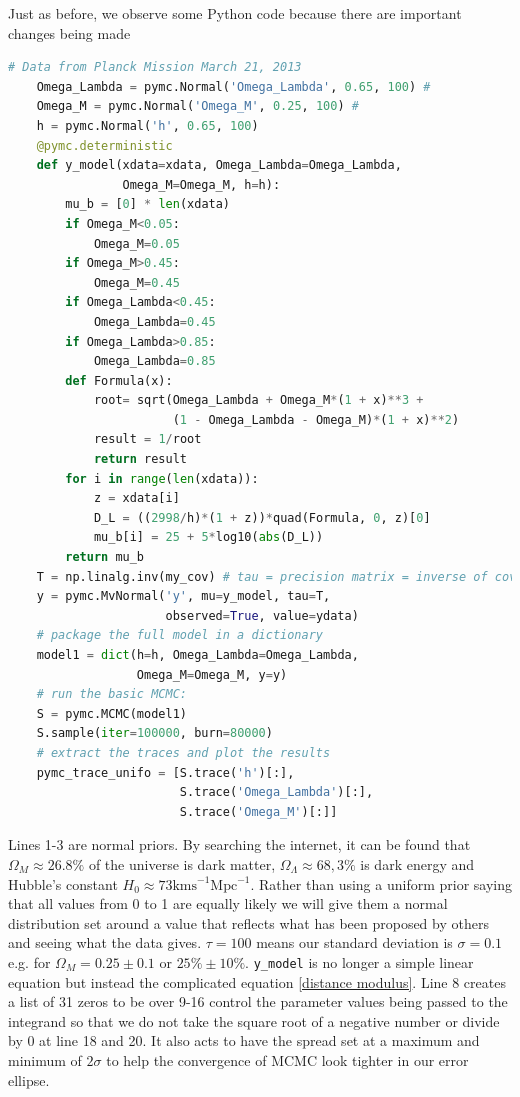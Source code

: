 \documentclass[12pt,twoside]{report}   %
\def\StartLineAt#1{\lstset{firstnumber=#1}}
\begin{document}
Just as before, we observe some Python code because there are important changes being made
\StartLineAt1
\begin{lstlisting}[label={python code 8},caption={Supernovae code snippet},language=Python]
	# Data from Planck Mission March 21, 2013
	Omega_Lambda = pymc.Normal('Omega_Lambda', 0.65, 100) #
	Omega_M = pymc.Normal('Omega_M', 0.25, 100) #
	h = pymc.Normal('h', 0.65, 100)
	@pymc.deterministic
	def y_model(xdata=xdata, Omega_Lambda=Omega_Lambda,
	            Omega_M=Omega_M, h=h):
    	mu_b = [0] * len(xdata)
    	if Omega_M<0.05:
        	Omega_M=0.05
    	if Omega_M>0.45:
        	Omega_M=0.45
    	if Omega_Lambda<0.45:
        	Omega_Lambda=0.45
    	if Omega_Lambda>0.85:
        	Omega_Lambda=0.85
    	def Formula(x):
        	root= sqrt(Omega_Lambda + Omega_M*(1 + x)**3 +
        	           (1 - Omega_Lambda - Omega_M)*(1 + x)**2)
        	result = 1/root                
        	return result
    	for i in range(len(xdata)):
        	z = xdata[i]
        	D_L = ((2998/h)*(1 + z))*quad(Formula, 0, z)[0]
        	mu_b[i] = 25 + 5*log10(abs(D_L))
    	return mu_b
	T = np.linalg.inv(my_cov) # tau = precision matrix = inverse of covariance matrix
	y = pymc.MvNormal('y', mu=y_model, tau=T,
	                  observed=True, value=ydata)
	# package the full model in a dictionary
	model1 = dict(h=h, Omega_Lambda=Omega_Lambda,
	              Omega_M=Omega_M, y=y)
	# run the basic MCMC:
	S = pymc.MCMC(model1)
	S.sample(iter=100000, burn=80000)
	# extract the traces and plot the results
	pymc_trace_unifo = [S.trace('h')[:],
                    	S.trace('Omega_Lambda')[:],
                    	S.trace('Omega_M')[:]]
\end{lstlisting}

Lines 1-3 are normal priors. By searching the internet, it can be found that $\Omega_M \approx 26.8\%$ of the universe is dark matter, $\Omega_\Lambda \approx 68,3\%$ is dark energy and Hubble's constant $H_0 \approx 73\mathrm{kms}^{-1}\mathrm{Mpc}^{-1}$. Rather than using a uniform prior saying that all values from 0 to 1 are equally likely we will give them a normal distribution set around a value that reflects what has been proposed by others and seeing what the data gives. $\tau = 100$ means our standard deviation is $\sigma = 0.1$ e.g. for $\Omega_M = 0.25 \pm 0.1$ or $25\%\pm10\%$. \texttt{y\_model} is no longer a simple linear equation but instead the complicated equation \ref{distance modulus}. Line 8 creates a list of 31 zeros to be over 9-16 control the parameter values being passed to the integrand so that we do not take the square root of a negative number or divide by 0 at line 18 and 20. It also acts to have the spread set at a maximum and minimum of $2\sigma$ to help the convergence of MCMC look tighter in our error ellipse.
\end{document}
